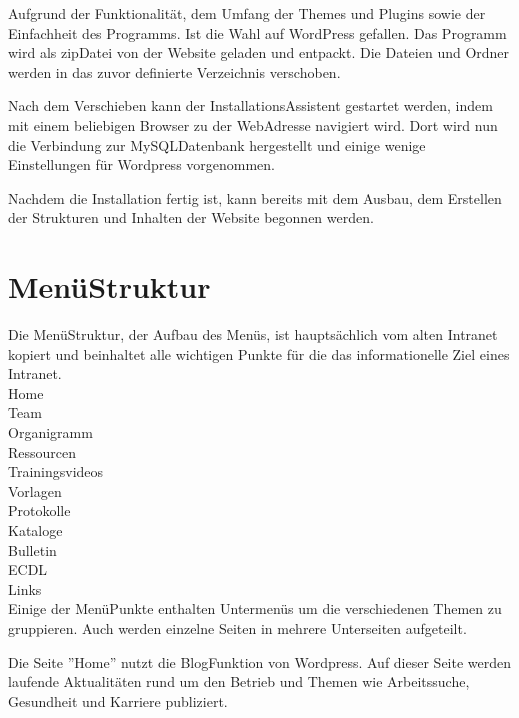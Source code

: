\documentclass[a4paper,11pt,twoside,titlepage,openright]{report}
\numberwithin{equation}{section}		%
\numberwithin{figure}{section}			%
\numberwithin{table}{section}				%
\begin{document}
Aufgrund der Funktionalität, dem Umfang der Themes und Plugins sowie der Einfachheit des Programms. Ist die Wahl auf WordPress gefallen. Das Programm wird als \gls{zip}\textendash Datei von der Website geladen und entpackt. Die Dateien und Ordner werden in das zuvor definierte Verzeichnis verschoben.

Nach dem Verschieben kann der Installations\textendash Assistent gestartet werden, indem mit einem beliebigen Browser zu der Web\textendash Adresse navigiert wird. Dort wird nun die Verbindung zur MySQL\textendash Datenbank hergestellt und einige wenige Einstellungen für Wordpress vorgenommen.

Nachdem die Installation fertig ist, kann bereits mit dem Ausbau, dem Erstellen der Strukturen und Inhalten der Website begonnen werden.

\section{Menü\textendash Struktur}

Die Menü\textendash Struktur, der Aufbau des Menüs, ist hauptsächlich vom alten Intranet kopiert und beinhaltet alle wichtigen Punkte für die das informationelle Ziel eines Intranet.\\
\textendash Home\\
\textbar \textemdash Team\\
\textbar \textemdash \textemdash Organigramm\\
\textbar \textemdash Ressourcen\\
\textbar \textemdash \textemdash Trainingsvideos\\
\textbar \textemdash \textemdash Vorlagen\\
\textbar \textemdash \textemdash Protokolle\\
\textbar \textemdash \textemdash Kataloge\\
\textbar \textemdash \textemdash Bulletin\\
\textbar \textemdash ECDL\\
\textbar \textemdash Links\\

Einige der Menü\textendash Punkte enthalten Untermenüs um die verschiedenen Themen zu gruppieren. Auch werden einzelne Seiten in mehrere Unterseiten aufgeteilt.

Die Seite ''Home'' nutzt die Blog\textendash Funktion von Wordpress. Auf dieser Seite werden laufende Aktualitäten rund um den Betrieb und Themen wie Arbeitssuche, Gesundheit und Karriere publiziert.
\end{document}
